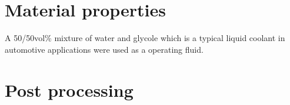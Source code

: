 \appendix
\doublespacing
\chapter{Material properties}
A 50/50vol\% mixture of water and glycole which is a typical liquid coolant in automotive applications were used as a operating fluid.

\chapter{Post processing}
\lipsum[24]
